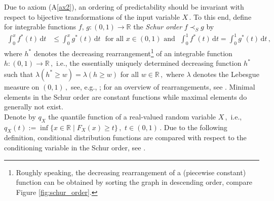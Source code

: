\documentclass{article}
\newcommand{\de}{\mathrm{\,d}}
\newcommand{\R}{\mathbb{R}}
\begin{document}
Due to axiom (A\ref{ax2}), an ordering of predictability should be invariant with respect to bijective transformations of the input variable \(X\,.\)
To this end, define for integrable functions \(f,\,g\colon (0,1)\to \R\) the \emph{Schur order} \(f\prec_S g\) by
\begin{align}\label{defschurfun}
\int_0^x f^*(t)\de t &\leq \int_0^x g^*(t)\de t ~~~\text{for all } x\in (0,1) \text{ and} ~~~
\int_0^1 f^*(t)\de t = \int_0^1 g^*(t)\de t\,,
\end{align}
where \(h^*\) denotes the decreasing rearrangement\footnote{Roughly speaking, the decreasing rearrangement of a (piecewise constant) function can be obtained by sorting the graph in descending order, compare Figure \ref{fig:schur_order}.} of an integrable function \(h\colon (0,1)\to \R\,,\) i.e., the essentially uniquely determined decreasing function \(h^*\) such that \(\lambda(h^*\geq w)=\lambda(h\geq w)\) for all \(w\in \R\,,\) where \(\lambda\) denotes the Lebesgue measure on \((0,1)\,,\) see, e.g., \cite{Ru-2013};
for an overview of rearrangements, see \cite{Chong-1974, Chong-1971, Day-1972, Hardy-1929, Luxemburg-1967, ruschendorf1981ordering}.
Minimal elements in the Schur order are constant functions while maximal elements do generally not exist. \\
Denote by \(q_X\) the quantile function of a real-valued random variable \(X\,,\) i.e., \(q_X(t):=\inf\{x\in \R\mid F_X(x)\geq t\}\,,\) \(t\in (0,1)\,.\)
Due to the following definition, conditional distribution functions are compared with respect to the conditioning variable in the Schur order, see \cite[Section 3.1]{Ansari-Fuchs-2022}.
\end{document}
